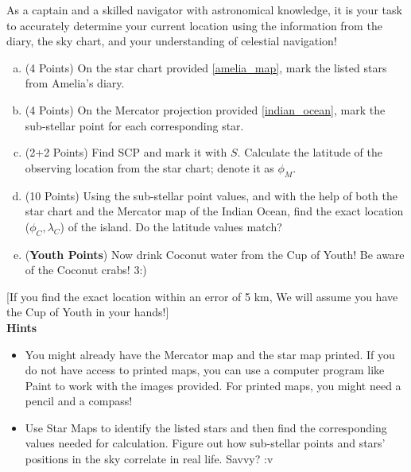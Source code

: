 \documentclass[a4paper,12pt]{extarticle}
\begin{document}
As a captain and a skilled navigator with astronomical knowledge, it is your task to accurately determine your current location using the information from the diary, the sky chart, and your understanding of celestial navigation!
\begin{enumerate}[a.]
	\item (4 Points) On the star chart provided \ref{amelia_map}, mark the listed stars from Amelia's diary.
	\item (4 Points) On the Mercator projection provided \ref{indian_ocean}, mark the sub-stellar point for each corresponding star. 
	\item (2+2 Points) Find SCP and mark it with $S$. Calculate the latitude of the observing location from the star chart; denote it as $\phi_M$.
	\item (10 Points) Using the sub-stellar point values, and with the help of both the star chart and the Mercator map of the Indian Ocean, find the exact location ($\phi_C, \lambda_C$) of the island. Do the latitude values match?
	\item (\textbf{Youth Points}) Now drink Coconut water from the Cup of Youth! Be aware of the Coconut crabs!  3:) 
\end{enumerate}
[\textsf{If you find the exact location within an error of 5 km, We will assume you have the Cup of Youth in your hands!}]\\

\textbf{Hints}
\begin{itemize}
	\itemsep0em 
	\item You might already have the Mercator map and the star map printed. If you do not have access to printed maps, you can use a computer program like Paint to work with the images provided. For printed maps, you might need a pencil and a compass!
	\item Use Star Maps to identify the listed stars and then find the corresponding values needed for calculation. Figure out how sub-stellar points and stars' positions in the sky correlate in real life. Savvy? :v  
\end{itemize}

\end{document}
